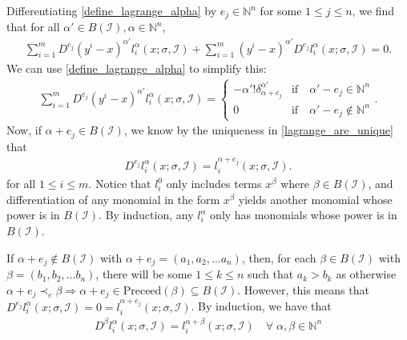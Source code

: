 \documentclass{article}
\theoremstyle{case}
\newcommand{\naturals}{\mathbb N}
\newcommand{\natsn}{\naturals^n}
\newcommand{\preceed}{{\textrm{Preceed}}}
\newcommand{\lte}{{\prec_{e}}}
\newcommand{\bidx}{{\mathcal I}}
\newcommand{\bsub}{{B(\bidx)}}
\begin{document}

Differentiating \cref{define_lagrange_alpha} by $e_j \in \natsn$ for some $1 \le j \le n$, we find that for all $\alpha' \in \bsub, \alpha \in \natsn$,
\begin{align*}
\sum_{i = 1}^m D^{e_j}(y^i - x)^{\alpha'}l^{\alpha}_i(x; \sigma, \bidx) + \sum_{i = 1}^m (y^i - x)^{\alpha'}D^{e_j}l^{\alpha}_i(x; \sigma, \bidx) = 0.
\end{align*}
We can use \cref{define_lagrange_alpha} to simplify this:
\begin{align*}
\sum_{i = 1}^m D^{e_j}(y^i - x)^{\alpha'}l^{\alpha}_i(x; \sigma, \bidx) =
\begin{cases}
-\alpha'!\delta^{\alpha'}_{\alpha+e_j} & \textrm{if} \quad \alpha' - e_j \in \natsn \\
0 & \textrm{if} \quad \alpha' - e_j \not \in \natsn
\end{cases}.
\end{align*}
Now, if $\alpha + e_j \in \bsub$, we know by the uniqueness in \cref{lagrange_are_unique} that
\begin{align}
D^{e_j}l_i^{\alpha}(x; \sigma, \bidx) = l_i^{\alpha + e_j}(x; \sigma, \bidx).
\end{align}
for all $1 \le i \le m$.
Notice that $l^0_i$ only includes terms $x^{\beta}$ where $\beta \in \bsub$, and
differentiation of any monomial in the form $x^{\beta}$ yields another monomial whose power is in $\bsub$.
By induction, any $l_i^{\alpha}$ only has monomials whose power is in $\bsub$.

If $\alpha + e_j \not \in \bsub$ with $\alpha + e_j = (a_1, a_2, \ldots a_n)$, 
then, for each $\beta \in \bsub$ with $\beta = (b_1, b_2, \ldots b_n)$,
there will be some $1 \le k \le n$ such that $a_k > b_k$ as otherwise $\alpha + e_j \lte \beta \Longrightarrow \alpha + e_j \in \preceed(\beta) \subseteq \bsub$.
However, this means that $D^{e_j}l_i^{\alpha}(x; \sigma, \bidx) = 0 = l_i^{\alpha + e_j}(x; \sigma, \bidx)$.
By induction, we have that 
\begin{align}
D^{\beta}l_i^{\alpha}(x; \sigma, \bidx) = l_i^{\alpha + \beta}(x; \sigma, \bidx) \quad \forall \; \alpha, \beta \in \natsn \label{addative_derivatives}
\end{align}
\end{document}
